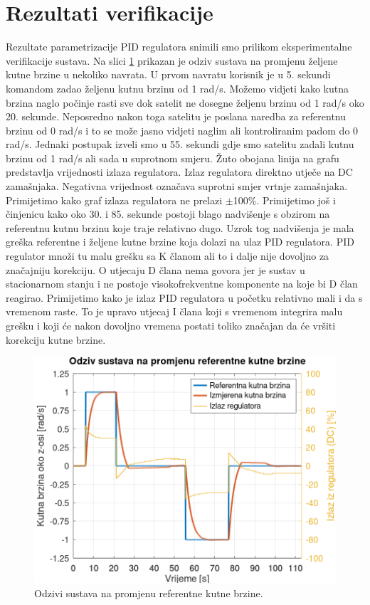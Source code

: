 \documentclass[times, utf8, diplomski, numeric]{templates/template}
\begin{document}
{    \section{Rezultati verifikacije}{
        Rezultate parametrizacije PID regulatora snimili smo prilikom eksperimentalne verifikacije sustava. Na slici \ref{fig:ang_vel_reg_user} prikazan je odziv sustava na promjenu željene kutne brzine u nekoliko navrata. U prvom navratu korisnik je u 5. sekundi komandom zadao željenu kutnu brzinu od 1 rad/s. Možemo vidjeti kako kutna brzina naglo počinje rasti sve dok satelit ne dosegne željenu brzinu od 1 rad/s oko 20. sekunde. Neposredno nakon toga satelitu je poslana naredba za referentnu brzinu od 0 rad/s i to se može jasno vidjeti naglim ali kontroliranim padom do 0 rad/s. Jednaki postupak izveli smo u 55. sekundi gdje smo satelitu zadali kutnu brzinu od 1 rad/s ali sada u suprotnom smjeru. Žuto obojana linija na grafu predstavlja vrijednosti izlaza regulatora. Izlaz regulatora direktno utječe na DC zamašnjaka. Negativna vrijednost označava suprotni smjer vrtnje zamašnjaka. Primijetimo kako graf izlaza regulatora ne prelazi $\pm$100\%. Primijetimo još i činjenicu kako oko 30. i 85. sekunde postoji blago nadvišenje s obzirom na referentnu kutnu brzinu koje traje relativno dugo. Uzrok tog nadvišenja je mala greška referentne i željene kutne brzine koja dolazi na ulaz PID regulatora. PID regulator množi tu malu grešku sa K članom ali to i dalje nije dovoljno za značajniju korekciju. O utjecaju D člana nema govora jer je sustav u stacionarnom stanju i ne postoje visokofrekventne komponente na koje bi D član reagirao. Primijetimo kako je izlaz PID regulatora u početku relativno mali i da s vremenom raste. To je upravo utjecaj I člana koji s vremenom integrira malu grešku i koji će nakon dovoljno vremena postati toliko značajan da će vršiti korekciju kutne brzine. 

        \begin{figure}[htb]
        \centering
        \includegraphics[width=1.0\textwidth]{other/ang_vel_reg_user.png}
        \caption{Odzivi sustava na promjenu referentne kutne brzine.}
        \label{fig:ang_vel_reg_user}
        \end{figure}

}}
\end{document}
